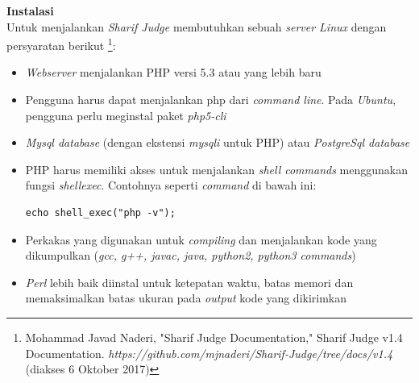 \documentclass[a4paper,twoside]{article}
\begin{document}
\begin{enumerate}
\begin{enumerate}
			\textbf{Instalasi} \\
			Untuk menjalankan \textit{Sharif Judge} membutuhkan sebuah \textit{server Linux} dengan persyaratan berikut \footnote{Mohammad Javad Naderi, "Sharif Judge Documentation," Sharif Judge v1.4 Documentation. \textit{https://github.com/mjnaderi/Sharif-Judge/tree/docs/v1.4} (diakses 6 Oktober 2017)}:
			\begin{itemize}
				\item \textit{Webserver} menjalankan PHP versi 5.3 atau yang lebih baru
				\item Pengguna harus dapat menjalankan php dari \textit{command line}. Pada \textit{Ubuntu}, pengguna perlu meginstal paket \textit{php5-cli}
				\item \textit{Mysql database} (dengan ekstensi \textit{mysqli} untuk PHP) atau \textit{PostgreSql database}
				\item PHP harus memiliki akses untuk menjalankan \textit{shell commands} menggunakan fungsi \textit{shell\textunderscore exec}. Contohnya seperti \textit{command} di bawah ini: 
				\begin{lstlisting}[backgroundcolor = \color{lightgray}]
echo shell_exec("php -v");
				\end{lstlisting}
				\item Perkakas yang digunakan untuk \textit{compiling} dan menjalankan kode yang dikumpulkan (\textit{gcc, g++, javac, java, python2, python3 commands})
				\item \textit{Perl} lebih baik diinstal untuk ketepatan waktu, batas memori dan memaksimalkan batas ukuran pada \textit{output} kode yang dikirimkan
			\end{itemize}
			

\end{enumerate}
\end{enumerate}
\end{document}
